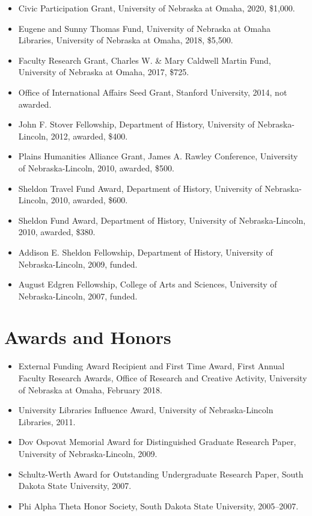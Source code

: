 \documentclass[10pt]{article}
\begin{document}
\begin{itemize}
  \item Civic Participation Grant, University of Nebraska at Omaha, 2020, \$1,000.
  \item Eugene and Sunny Thomas Fund, University of Nebraska at Omaha Libraries, University of Nebraska at Omaha, 2018, \$5,500.
  \item Faculty Research Grant, Charles W. \& Mary Caldwell Martin Fund, University of Nebraska at Omaha, 2017, \$725.
  \item Office of International Affairs Seed Grant, Stanford University, 2014, not awarded.
  \item John F. Stover Fellowship, Department of History, University of Nebraska-Lincoln, 2012, awarded, \$400.
  \item Plains Humanities Alliance Grant, James A. Rawley Conference, University of Nebraska-Lincoln, 2010, awarded, \$500.
  \item Sheldon Travel Fund Award, Department of History, University of Nebraska-Lincoln, 2010, awarded, \$600.
  \item Sheldon Fund Award, Department of History, University of Nebraska-Lincoln, 2010, awarded, \$380.
  \item Addison E. Sheldon Fellowship, Department of History, University of Nebraska-Lincoln, 2009, funded.
  \item August Edgren Fellowship, College of Arts and Sciences, University of Nebraska-Lincoln, 2007, funded.
\end{itemize}

\section{Awards and Honors}

\begin{itemize}
  \item External Funding Award Recipient and First Time Award, First Annual Faculty Research Awards, Office of Research and Creative Activity, University of Nebraska at Omaha, February 2018.
  \item University Libraries Influence Award, University of Nebraska-Lincoln Libraries, 2011.
  \item Dov Ospovat Memorial Award for Distinguished Graduate Research Paper, University of Nebraska-Lincoln, 2009.
  \item Schultz-Werth Award for Outstanding Undergraduate Research Paper, South Dakota State University, 2007.
  \item Phi Alpha Theta Honor Society, South Dakota State University, 2005--2007.
\end{itemize}
\end{document}
